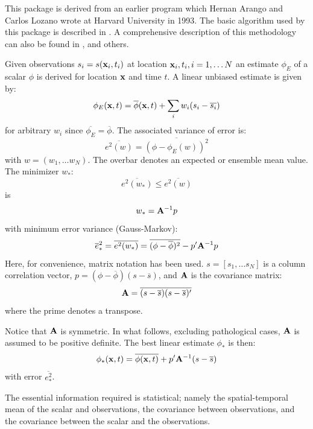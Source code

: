 This  package is derived from an earlier program which Hernan
Arango and Carlos Lozano wrote at Harvard University in 1993.   The
basic algorithm used by this package is described in
\citet{Carter87}.  A comprehensive description of this
methodology can also be found in \citet{Gandin63,
Bretherton76, McWilliams86, Daley91, Bennett92}, and others.

Given observations $s_i = s({\bf x}_i, t_i)$ at location ${\bf x}_i,
t_i, i = 1, \ldots N$ an estimate $\phi_E$ of a scalar $\phi$ is
derived for location ${\bf x}$ and time $t$.  A linear unbiased estimate
is given by:
\[
   \phi_E({\bf x}, t) = \overline{\phi}({\bf x},t) + \sum_i w_i (s_i -
   \overline{s_i})
\]
for arbitrary $w_i$ since $\overline{\phi_E} = \overline{\phi}$.  The
associated variance of error is:
\[
  \overline{e^2(w)} = \overline{(\phi - \phi_E(w))^2}
\]
with $w = (w_1, \ldots w_N)$.  The overbar denotes an expected or
ensemble mean value.  The minimizer $w_*$:
\[
   \overline{e^2 (w_*)} \leq \overline{e^2(w)}
\]
is
\[
   w_* = {\bf A}^{-1} p
\]
with minimum error variance (Gauss-Markov):
\[
   \overline{e}^2_* = \overline{e^2(w_*)} = \overline{(\phi -
   \overline{\phi})^2} - p' {\bf A}^{-1} p
\]
Here, for convenience, matrix notation has been used.  $s = [s_1, \ldots
s_N]$ is a column correlation vector, $p = (\phi - \overline{\phi})(s
- \overline{s})$, and ${\bf A}$ is the covariance matrix:
\[
   {\bf A} = \overline{(s - \overline{s})(s - \overline{s})'}
\]
where the prime denotes a transpose.

Notice that ${\bf A}$ is symmetric.  In what follows, excluding
pathological cases, ${\bf A}$ is assumed to be positive definite.
The best linear estimate $\phi_*$ is then:
\[
   \phi_*({\bf x}, t) = \overline{\phi({\bf x}, t)} + p' {\bf A}^{-1}
   (s - \overline{s})
\]
with error $\overline{e^2_*}$.

The essential information required is statistical; namely the
spatial-temporal mean of the scalar and observations, the covariance
between observations, and the covariance between the scalar and the
observations.

